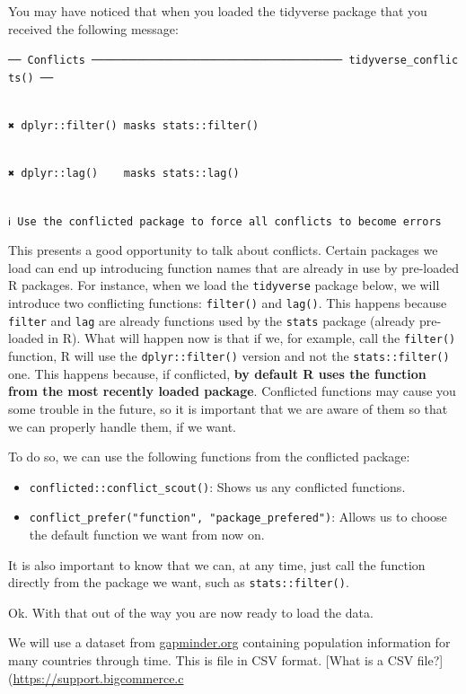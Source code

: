 \documentclass[
]{book}
\providecommand{\tightlist}{%
  \setlength{\itemsep}{0pt}\setlength{\parskip}{0pt}}
\begin{document}
You may have noticed that when you loaded the tidyverse package that you received the following message:

\texttt{──\ Conflicts\ ───────────────────────────────────────\ tidyverse\_conflicts()\ ──}\strut \\
\texttt{✖\ dplyr::filter()\ masks\ stats::filter()}\strut \\
\texttt{✖\ dplyr::lag()\ \ \ \ masks\ stats::lag()}\strut \\
\texttt{ℹ\ Use\ the\ conflicted\ package\ to\ force\ all\ conflicts\ to\ become\ errors}

This presents a good opportunity to talk about conflicts. Certain packages we load can end up introducing function names that are already in use by pre-loaded R packages. For instance, when we load the \texttt{tidyverse} package below, we will introduce two conflicting functions: \texttt{filter()} and \texttt{lag()}. This happens because \texttt{filter} and \texttt{lag} are already functions used by the \texttt{stats} package (already pre-loaded in R). What will happen now is that if we, for example, call the \texttt{filter()} function, R will use the \texttt{dplyr::filter()} version and not the \texttt{stats::filter()} one. This happens because, if conflicted, \textbf{by default R uses the function from the most recently loaded package}. Conflicted functions may cause you some trouble in the future, so it is important that we are aware of them so that we can properly handle them, if we want.

To do so, we can use the following functions from the conflicted package:

\begin{itemize}
\tightlist
\item
  \texttt{conflicted::conflict\_scout()}: Shows us any conflicted functions.
\item
  \texttt{conflict\_prefer("function",\ "package\_prefered")}: Allows us to choose the default function we want from now on.
\end{itemize}

It is also important to know that we can, at any time, just call the function directly from the package we want, such as \texttt{stats::filter()}.

Ok. With that out of the way you are now ready to load the data.

We will use a dataset from \url{gapminder.org} containing population information for many countries through time. This is file in CSV format. {[}What is a CSV file?{]}(\url{https://support.bigcommerce.c}
\end{document}
